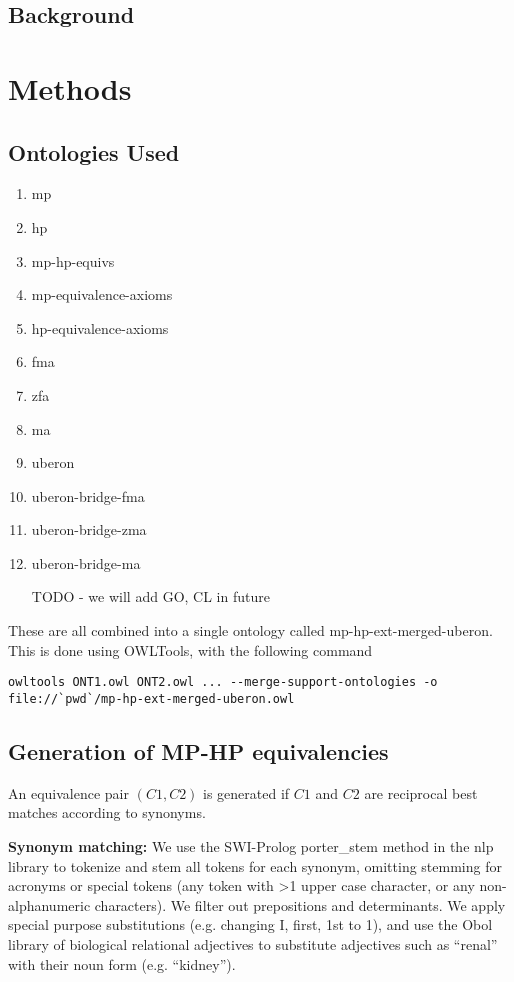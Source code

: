 
\subsection{Background}

\section{Methods}

\subsection{Ontologies Used}

\begin{enumerate}
\item mp
\item hp
\item mp-hp-equivs
\item mp-equivalence-axioms
\item hp-equivalence-axioms
\item fma
\item zfa
\item ma
\item uberon
\item uberon-bridge-fma
\item uberon-bridge-zma
\item uberon-bridge-ma
\item [TODO - we will add GO, CL in future]
\end{enumerate}

These are all combined into a single ontology called mp-hp-ext-merged-uberon. This is done using OWLTools, with the following command

\begin{verbatim}
owltools ONT1.owl ONT2.owl ... --merge-support-ontologies -o file://`pwd`/mp-hp-ext-merged-uberon.owl
\end{verbatim}

\subsection{Generation of MP-HP equivalencies}

An equivalence pair $(C1,C2)$ is generated if $C1$ and $C2$ are
reciprocal best matches according to synonyms.

\textbf{Synonym matching:} We use the SWI-Prolog porter_stem method in
the nlp library to tokenize and stem all tokens for each synonym,
omitting stemming for acronyms or special tokens (any token with >1
upper case character, or any non-alphanumeric characters). We filter
out prepositions and determinants. We apply special purpose
substitutions (e.g. changing I, first, 1st to 1), and use the Obol
library of biological relational adjectives to substitute adjectives
such as ``renal'' with their noun form (e.g. ``kidney'').

